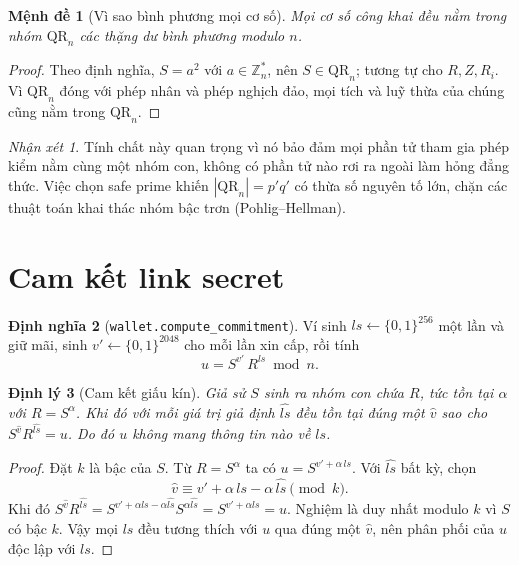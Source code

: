 \documentclass[a4paper,11pt]{article}
\theoremstyle{definition}
\newtheorem{definition}{Định nghĩa}[section]
\theoremstyle{plain}
\newtheorem{theorem}[definition]{Định lý}
\newtheorem{proposition}[definition]{Mệnh đề}
\theoremstyle{remark}
\newtheorem*{remark}{Nhận xét}
\newcommand{\Zn}{\mathbb{Z}_n^{*}}
\newcommand{\QR}{\mathrm{QR}_n}
\begin{document}
\begin{proposition}[Vì sao bình phương mọi cơ số]
Mọi cơ số công khai đều nằm trong nhóm $\QR$ các thặng dư bình phương modulo $n$.
\end{proposition}

\begin{proof}
Theo định nghĩa, $S=a^2$ với $a\in\Zn$, nên $S\in\QR$; tương tự cho $R,Z,R_i$. Vì $\QR$
đóng với phép nhân và phép nghịch đảo, mọi tích và luỹ thừa của chúng cũng nằm trong
$\QR$.
\end{proof}

\begin{remark}
Tính chất này quan trọng vì nó bảo đảm mọi phần tử tham gia phép kiểm nằm cùng một nhóm
con, không có phần tử nào rơi ra ngoài làm hỏng đẳng thức. Việc chọn safe prime khiến
$|\QR|=p'q'$ có thừa số nguyên tố lớn, chặn các thuật toán khai thác nhóm bậc trơn
(Pohlig--Hellman).
\end{remark}

\section{Cam kết link secret}

\begin{definition}[\texttt{wallet.compute\_commitment}]
Ví sinh $\mathit{ls}\leftarrow\{0,1\}^{256}$ một lần và giữ mãi, sinh
$v'\leftarrow\{0,1\}^{2048}$ cho mỗi lần xin cấp, rồi tính
\[
u = S^{v'}\, R^{\mathit{ls}} \bmod n .
\]
\end{definition}

\begin{theorem}[Cam kết giấu kín]
\label{thm:hiding}
Giả sử $S$ sinh ra nhóm con chứa $R$, tức tồn tại $\alpha$ với $R=S^{\alpha}$. Khi đó với
mỗi giá trị giả định $\widehat{\mathit{ls}}$ đều tồn tại đúng một $\widehat{v}$ sao cho
$S^{\widehat v}R^{\widehat{\mathit{ls}}}=u$. Do đó $u$ không mang thông tin nào về
$\mathit{ls}$.
\end{theorem}

\begin{proof}
Đặt $k$ là bậc của $S$. Từ $R=S^{\alpha}$ ta có
$u=S^{v'+\alpha\,\mathit{ls}}$. Với $\widehat{\mathit{ls}}$ bất kỳ, chọn
\[
\widehat v \equiv v' + \alpha\,\mathit{ls} - \alpha\,\widehat{\mathit{ls}} \pmod{k}.
\]
Khi đó $S^{\widehat v}R^{\widehat{\mathit{ls}}}
= S^{v'+\alpha \mathit{ls}-\alpha\widehat{\mathit{ls}}}S^{\alpha\widehat{\mathit{ls}}}
= S^{v'+\alpha\mathit{ls}} = u$. Nghiệm là duy nhất modulo $k$ vì $S$ có bậc $k$. Vậy mọi
$\widehat{\mathit{ls}}$ đều tương thích với $u$ qua đúng một $\widehat v$, nên phân phối
của $u$ độc lập với $\mathit{ls}$.
\end{proof}
\end{document}
